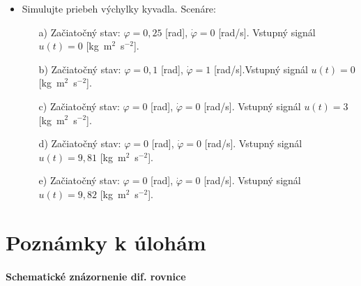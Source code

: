 \documentclass[a4paper, 10pt, ]{article}
\begin{document}
\begin{itemize}[leftmargin=0pt, labelsep=3mm, itemsep=0pt]
    \item Simulujte priebeh výchylky kyvadla.
    \newline
    Scenáre:
    \vspace{-6pt}
    \begin{itemize}[leftmargin=0pt, labelsep=4mm, itemsep=0pt]
                \item[a)] Začiatočný stav: $\varphi = 0,25$ [rad], $\dot\varphi = 0$ [rad/s]. Vstupný signál $u(t) = 0$ [kg~m$^2$~s$^{-2}$].
                \item[b)] Začiatočný stav: $\varphi = 0,1$ [rad], $\dot\varphi = 1$ [rad/s].Vstupný signál $u(t) = 0$ [kg~m$^2$~s$^{-2}$].
                \item[c)] Začiatočný stav: $\varphi = 0$ [rad], $\dot\varphi = 0$ [rad/s]. Vstupný signál $u(t) = 3$ [kg~m$^2$~s$^{-2}$].
                \item[d)] Začiatočný stav: $\varphi = 0$ [rad], $\dot\varphi = 0$ [rad/s]. Vstupný signál $u(t) = 9,81$ [kg~m$^2$~s$^{-2}$].
                \item[e)] Začiatočný stav: $\varphi = 0$ [rad], $\dot\varphi = 0$ [rad/s]. Vstupný signál $u(t) = 9,82$ [kg~m$^2$~s$^{-2}$].
            \end{itemize}
\end{itemize}














\section{Poznámky k úlohám}


\paragraph{Schematické znázornenie dif. rovnice}
\end{document}
